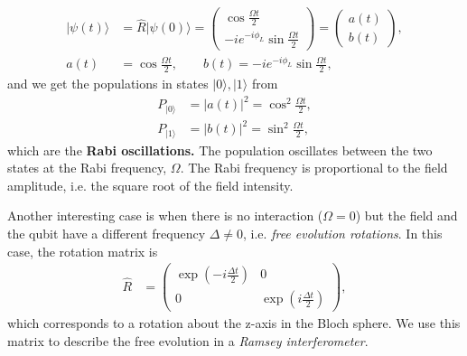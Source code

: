 \documentclass[a4paper, 11pt, normalem]{report}
\begin{document}
\begin{align}
    |\psi(t)\rangle &= \hat{R}|\psi(0)\rangle = \begin{pmatrix} \cos\frac{\Omega t}{2} \\ -ie^{-i\phi_L}\sin\frac{\Omega t}{2} \end{pmatrix} = \begin{pmatrix} a(t) \\ b(t)\end{pmatrix}, \\
    a(t) &= \cos\frac{\Omega t}{2}, \qquad b(t) = -ie^{-i\phi_L}\sin\frac{\Omega t}{2},
\end{align}
and we get the populations in states $|0\rangle,|1\rangle$ from
\begin{align}
    P_{|0\rangle} &= |a(t)|^2 = \cos^2\frac{\Omega t}{2},\\
    P_{|1\rangle} &= |b(t)|^2 = \sin^2\frac{\Omega t}{2},
\end{align}
which are the \textbf{Rabi oscillations.}
The population oscillates between the two states at the Rabi frequency, $\Omega$.
The Rabi frequency is proportional to the field amplitude, i.e. the square root of the field intensity.
\begin{figure}[H]
    \centering
\end{figure}
Another interesting case is when there is no interaction ($\Omega=0$) but the field and the qubit have a different frequency $\Delta\neq0$, i.e. \emph{free evolution rotations}.
In this case, the rotation matrix is
\begin{align}
    \hat{R} &= \begin{pmatrix} \exp\left(-i\frac{\Delta t}{2}\right) & 0 \\ 0 & \exp\left(i\frac{\Delta t}{2}\right)\end{pmatrix},
\end{align}
which corresponds to a rotation about the z-axis in the Bloch sphere.
We use this matrix to describe the free evolution in a \emph{Ramsey interferometer}.
\end{document}
